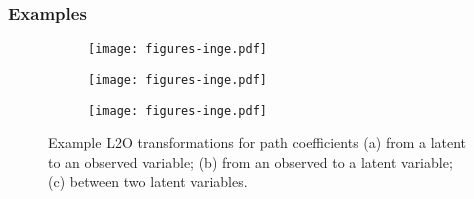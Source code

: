 \documentclass{beamer}
\begin{document}
\begin{frame}
	\frametitle{Examples}
		\begin{figure}[t]
		    \centering
		    \begin{subfigure}[b]{.33\linewidth}
		    	\centering
			\texttt{[image: figures-inge.pdf]}
		        \caption{}
			\label{fig:l2o_parent}
		    \end{subfigure}%
		    \begin{subfigure}[b]{.33\linewidth}
		    	\centering
			\texttt{[image: figures-inge.pdf]}
		        \caption{}
			\label{fig:l2o_child}
		    \end{subfigure}%
		    \begin{subfigure}[b]{.33\linewidth}
		    	\centering
			\texttt{[image: figures-inge.pdf]}
		        \caption{}
			\label{fig:l2o_both}
		    \end{subfigure}
			\caption{Example L2O transformations for path
			coefficients (a) from a latent to an observed variable;
			(b) from an observed to a latent variable; (c) between
			two latent variables.}
		\end{figure}
\end{frame}
\end{document}
